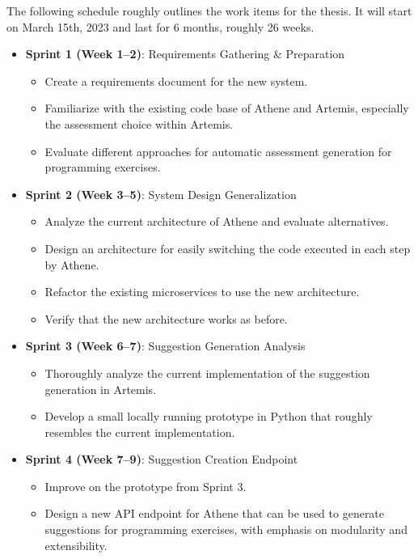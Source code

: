 The following schedule roughly outlines the work items for the thesis. It will start on March 15th, 2023 and last for 6 months, roughly 26 weeks.

\begin{itemize}
    \item \textbf{Sprint 1 (Week 1--2)}: Requirements Gathering \& Preparation
    \begin{itemize}
        \item Create a requirements document for the new system.
        \item Familiarize with the existing code base of Athene and Artemis, especially the assessment choice within Artemis.
        \item Evaluate different approaches for automatic assessment generation for programming exercises.
    \end{itemize}
    \item \textbf{Sprint 2 (Week 3--5)}: System Design Generalization
    \begin{itemize}
        \item Analyze the current architecture of Athene and evaluate alternatives.
        \item Design an architecture for easily switching the code executed in each step by Athene.
        \item Refactor the existing microservices to use the new architecture.
        \item Verify that the new architecture works as before.
    \end{itemize}
    \item \textbf{Sprint 3 (Week 6--7)}: Suggestion Generation Analysis
    \begin{itemize}
        \item Thoroughly analyze the current implementation of the suggestion generation in Artemis.
        \item Develop a small locally running prototype in Python that roughly resembles the current implementation.
    \end{itemize}
    \item \textbf{Sprint 4 (Week 7--9)}: Suggestion Creation Endpoint
    \begin{itemize}
        \item Improve on the prototype from Sprint 3.
        \item Design a new API endpoint for Athene that can be used to generate suggestions for programming exercises, with emphasis on modularity and extensibility.

\end{itemize}
\end{itemize}
